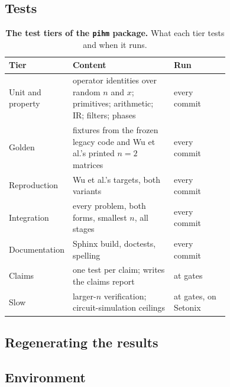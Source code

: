 \subsection{Tests}
\label{app:software-tests}

\begin{table}[htbp]
    \centering
    \caption[The test tiers of the \texttt{pihm} package]{\textbf{The test tiers of the \texttt{pihm} package.} What each tier tests and when it runs.}
    \label{tab:test-tiers}
    \small
    \begin{tabular}{@{}l p{0.48\linewidth} p{0.26\linewidth}@{}}
        \toprule
        Tier & Content & Run \\
        \midrule
        Unit and property & operator identities over random $n$ and $x$; primitives; arithmetic; IR; filters; phases & every commit \\
        Golden & fixtures from the frozen legacy code and Wu et al.'s printed $n = 2$ matrices & every commit \\
        Reproduction & Wu et al.'s targets, both variants & every commit \\
        Integration & every problem, both forms, smallest $n$, all stages & every commit \\
        Documentation & Sphinx build, doctests, spelling & every commit \\
        Claims & one test per claim; writes the claims report & at gates \\
        Slow & larger-$n$ verification; circuit-simulation ceilings & at gates, on Setonix \\
        \bottomrule
    \end{tabular}
\end{table}

\subsection{Regenerating the results}
\label{app:software-regenerate}

\subsection{Environment}
\label{app:software-environment}
